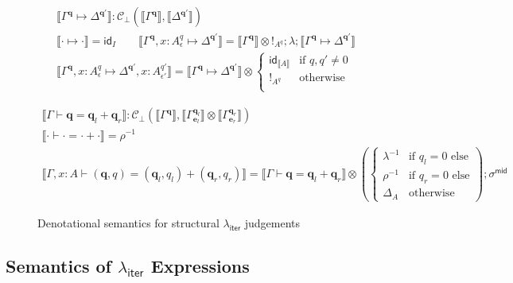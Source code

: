 \documentclass[acmsmall,screen,review]{acmart}
\newcommand{\mc}[1]{\ensuremath{\mathcal{#1}}}
\newcommand{\mb}[1]{\ensuremath{\mathbf{#1}}}
\newcommand{\ms}[1]{\ensuremath{\mathsf{#1}}}
\newcommand{\qsp}[4]{#1 \vdash #2 = #3 + #4}
\newcommand{\cwk}[2]{#1 \mapsto #2}
\newcommand{\dnt}[1]{\llbracket{#1}\rrbracket}
\newcommand{\tmor}[1]{{!}_{#1}}
\newcommand{\dmor}[1]{{\Delta}_{#1}}
\newcommand{\subiterexp}{\texorpdfstring{\(\lambda_{\ms{iter}}\)}{lambda-iter}}
\begin{document}
\begin{figure}
  \begin{adjustbox}{minipage=1.1\textwidth,scale=0.9}
  \begin{gather*}
    \boxed{\dnt{\cwk{\Gamma^{\mb{q}}}{\Delta^{\mb{q}'}}} 
      : \mc{C}_\bot(\dnt{\Gamma^{\mb{q}}}, \dnt{\Delta^{\mb{q}'}})} \\
    \dnt{\cwk{\cdot}{\cdot}} = \ms{id}_I \qquad
    \dnt{\cwk{\Gamma^{\mb{q}}, x : A^q_\epsilon}{\Delta^{\mb{q}'}}}
      = \dnt{\Gamma^{\mb{q}}} \otimes \tmor{A^q}
      ; \lambda
      ; \dnt{\cwk{\Gamma^{\mb{q}}}{\Delta^{\mb{q}'}}} \\
    \dnt{\cwk{\Gamma^{\mb{q}}, x : A^q_\epsilon}
              {\Delta^{\mb{q}'}, x : A^{q'}_{\epsilon'}}}
      = \dnt{\cwk{\Gamma^{\mb{q}}}{\Delta^{\mb{q}'}}} \otimes \begin{cases}
        \ms{id}_{\dnt{A}} & \text{if } q, q' \neq 0 \\
        \tmor{A^q} & \text{otherwise} \\
      \end{cases}
  \end{gather*}

  \begin{gather*}
    \boxed{\dnt{\qsp{\Gamma}{\mb{q}}{\mb{q}_l}{\mb{q}_r}} 
      : \mc{C}_\bot(\dnt{\Gamma^{\mb{q}}}, 
        \dnt{\Gamma^{\mb{q}_l}_{\mb{e}_l}} \otimes \dnt{\Gamma^{\mb{q}_r}_{\mb{e}_r}})} 
    \\
    \dnt{\qsp{\cdot}{\cdot}{\cdot}{\cdot}} = \rho^{-1}
    \\
    \dnt{\qsp{\Gamma, x : A}{(\mb{q}, q)}{(\mb{q}_l, q_l)}{(\mb{q}_r, q_r)}}
    = \dnt{\qsp{\Gamma}{\mb{q}}{\mb{q}_l}{\mb{q}_r}} \otimes
    \left(\begin{cases}
      \lambda^{-1} & \text{if } q_l = 0 \text{ else} \\
      \rho^{-1} & \text{if } q_r = 0 \text{ else} \\
      \dmor{A} & \text{otherwise}
    \end{cases}\right) 
    ; \sigma^{\ms{mid}}
  \end{gather*}
  \end{adjustbox}
  \caption{Denotational semantics for structural \subiterexp{} judgements}
  \Description{}
  \label{fig:struct-sem}
\end{figure}

\subsection{Semantics of \subiterexp{} Expressions}
\end{document}
